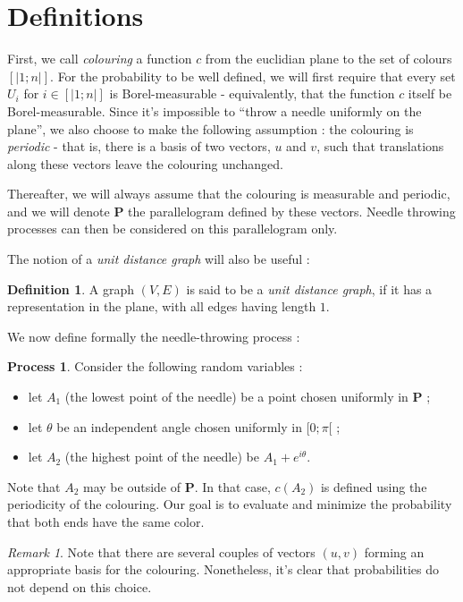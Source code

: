 \documentclass[a4paper,11pt]{article}
\theoremstyle{definition}
\newtheorem{definition}{Definition}
\newtheorem{process}{Process}
\theoremstyle{remark}
\newtheorem{remark}{Remark}
\begin{document}
\section{Definitions}
\label{def}
First, we call \emph{colouring} a function $c$ from the euclidian plane to the set of colours $[| 1 ; n |]$. For the probability to be well defined, we will first require that every set $U_i$ for $i \in [| 1 ; n |]$ is Borel-measurable - equivalently, that the function $c$ itself be Borel-measurable. Since it's impossible to ``throw a needle uniformly on the plane'', we also choose to make the following assumption : 
the colouring is \textit{periodic} - that is, there is a basis of two vectors, $u$ and $v$, such that translations along these vectors leave the colouring unchanged.

Thereafter, we will always assume that the colouring is measurable and periodic, and we will denote $\mathbf{P}$ the parallelogram defined by these vectors. Needle throwing processes can then be considered on this parallelogram only.

The notion of a \emph{unit distance graph} will also be useful :
\begin{definition}
A graph $(V,E) $ is said to be a \emph{unit distance graph}, if it has a representation in the plane, with all edges having length $1$.
\end{definition}

We now define formally the needle-throwing process :
\begin{process}
Consider the following random variables :
\begin{itemize}
  \item let $A_1$ (the lowest point of the needle) be a point chosen uniformly in $\mathbf{P}$ ;
  \item let $\theta$ be an independent angle chosen uniformly in $[0;\pi[$ ;
  \item let $A_2$ (the highest point of the needle) be $A_1 + e^{i \theta}$.
\end{itemize}
\end{process}

Note that $A_2$ may be outside of $\mathbf{P}$. In that case, $c(A_2)$ is defined using the periodicity of the colouring.
Our goal is to evaluate and minimize the probability that both ends have the same color.

\begin{remark}
Note that there are several couples of vectors $(u,v)$ forming an appropriate basis for the 
colouring. Nonetheless, it's clear that probabilities do not depend on this choice. 
\end{remark}
\end{document}

